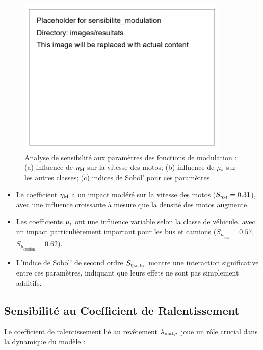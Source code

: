 \begin{figure}[htbp]
\centering
\includegraphics[width=0.9\textwidth]{images/resultats/sensibilite_modulation}
\caption{Analyse de sensibilité aux paramètres des fonctions de modulation : (a) influence de $\eta_{\text{M}}$ sur la vitesse des motos; (b) influence de $\mu_{i}$ sur les autres classes; (c) indices de Sobol' pour ces paramètres.}
\label{fig:sensibilite_modulation}
\end{figure}

\begin{itemize}
\item Le coefficient $\eta_{\text{M}}$ a un impact modéré sur la vitesse des motos ($S_{\eta_{\text{M}}} = 0.31$), avec une influence croissante à mesure que la densité des motos augmente.
\item Les coefficients $\mu_{i}$ ont une influence variable selon la classe de véhicule, avec un impact particulièrement important pour les bus et camions ($S_{\mu_{\text{bus}}} = 0.57$, $S_{\mu_{\text{camion}}} = 0.62$).
\item L'indice de Sobol' de second ordre $S_{\eta_{\text{M}},\mu_{i}}$ montre une interaction significative entre ces paramètres, indiquant que leurs effets ne sont pas simplement additifs.
\end{itemize}

\subsection{Sensibilité au Coefficient de Ralentissement}
\label{subsec:sensibilite_ralentissement}

Le coefficient de ralentissement lié au revêtement $\lambda_{\text{mat},{i}}$ joue un rôle crucial dans la dynamique du modèle :

